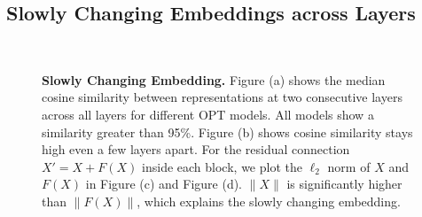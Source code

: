 \subsection{Slowly Changing Embeddings across Layers}
\label{sec:obs_slowly_changing}

\begin{figure}[]
\vspace{-2mm}
  \centering
   \\
  \vspace{-4mm}
  \vspace{-0.3em}
  \caption{\textbf{Slowly Changing Embedding.} Figure (a) shows the median cosine similarity between representations at two consecutive layers across all layers for different OPT models. All models show a similarity greater than 95\%. Figure (b) shows cosine similarity stays high even a few layers apart. For the residual connection $X' = X + F(X)$ inside each block, we plot the $\ell_2$ norm of $X$ and $F(X)$ in Figure (c) and Figure (d). $\|X\|$ is significantly higher than $\|F(X)\|$, which explains the slowly changing embedding.\vspace{-1em}}

\end{figure}
